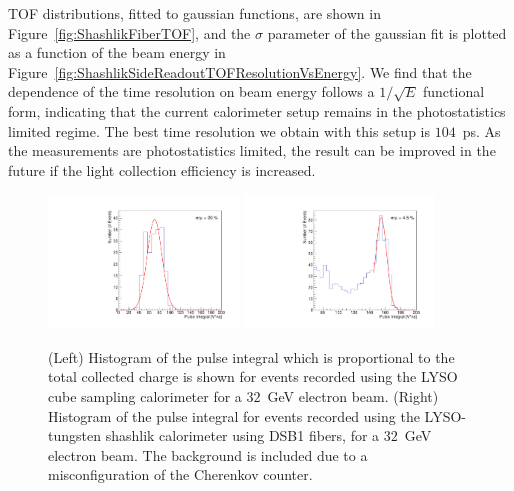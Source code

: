 TOF distributions, fitted to gaussian functions,
are shown in Figure~\ref{fig:ShashlikFiberTOF}, and the 
$\sigma$ parameter of the gaussian fit is plotted as a function of the
beam energy in Figure~\ref{fig:ShashlikSideReadoutTOFResolutionVsEnergy}.
We find that the dependence of the time resolution on
beam energy follows a $1/\sqrt{E}$ functional form, indicating
that the current calorimeter setup remains in the photostatistics limited regime. 
The best time resolution we obtain with this setup is $104$~ps. As the measurements are 
photostatistics limited, the result can be improved in the future if the light collection
efficiency is increased.
\begin{figure}[h] \centering
\includegraphics[width=0.45\textwidth]{figs/TOF_Electron_LYSOCube_32GeV_energy} 
\includegraphics[width=0.45\textwidth]{figs/TOF_ShashlikDSB1Fiber_Electron_32GeV_energy} 
\caption{ (Left) Histogram of the pulse integral which is proportional to the
total collected charge is shown for events recorded using the LYSO cube sampling
calorimeter for a $32$~GeV electron beam. (Right) Histogram of the pulse
integral for events recorded using the LYSO-tungsten shashlik calorimeter using
DSB1 fibers, for a $32$~GeV electron beam. The background is included due to a
misconfiguration of the Cherenkov counter. } 
\label{fig:ShashlikFiberEnergy32GeV}
\end{figure}

